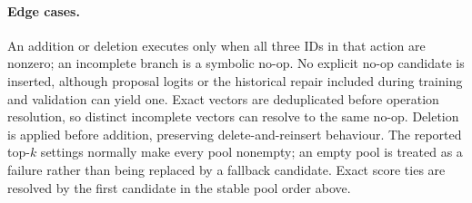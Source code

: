 \documentclass[a4paper,UKenglish,cleveref,autoref,thm-restate]{tgdk-v2021}
\begin{document}
\paragraph*{Edge cases.}
An addition or deletion executes only when all three IDs in that action are nonzero; an incomplete branch is a symbolic no-op. No explicit no-op candidate is inserted, although proposal logits or the historical repair included during training and validation can yield one. Exact vectors are deduplicated before operation resolution, so distinct incomplete vectors can resolve to the same no-op. Deletion is applied before addition, preserving delete-and-reinsert behaviour. The reported top-\(k\) settings normally make every pool nonempty; an empty pool is treated as a failure rather than being replaced by a fallback candidate. Exact score ties are resolved by the first candidate in the stable pool order above.
\end{document}

